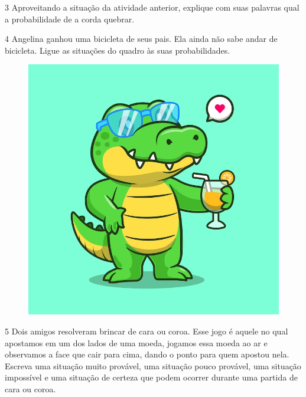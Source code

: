 \num{3} Aproveitando a situação da atividade anterior, explique com suas
palavras qual a probabilidade de a corda quebrar.


\num{4} Angelina ganhou uma bicicleta de seus pais. Ela ainda não sabe andar de
bicicleta. Ligue as situações do quadro às suas probabilidades.


\begin{figure}[htpb!]
\includegraphics[width=\textwidth]{./media/image87.png}
\end{figure}


\num{5} Dois amigos resolveram brincar de cara ou coroa. Esse jogo é aquele no
qual apostamos em um dos lados de uma moeda, jogamos essa moeda ao ar e observamos a face
que cair para cima, dando o ponto para quem apostou nela. Escreva uma
situação muito provável, uma situação pouco provável, uma situação
impossível e uma situação de certeza que podem ocorrer durante uma partida de cara ou coroa.

